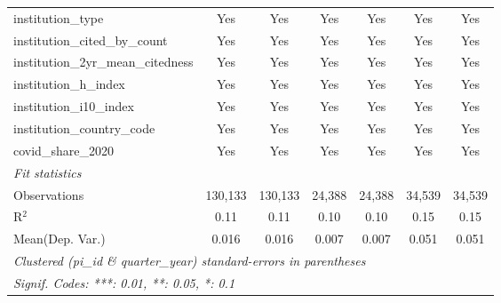 \begin{tabular}{lcccccc}
   institution\_type                                           & Yes            & Yes            & Yes            & Yes             & Yes          & Yes\\  
   institution\_cited\_by\_count                               & Yes            & Yes            & Yes            & Yes             & Yes          & Yes\\  
   institution\_2yr\_mean\_citedness                           & Yes            & Yes            & Yes            & Yes             & Yes          & Yes\\  
   institution\_h\_index                                       & Yes            & Yes            & Yes            & Yes             & Yes          & Yes\\  
   institution\_i10\_index                                     & Yes            & Yes            & Yes            & Yes             & Yes          & Yes\\  
   institution\_country\_code                                  & Yes            & Yes            & Yes            & Yes             & Yes          & Yes\\  
   covid\_share\_2020                                          & Yes            & Yes            & Yes            & Yes             & Yes          & Yes\\  
   \midrule
   \emph{Fit statistics}\\
   Observations                                                & 130,133        & 130,133        & 24,388         & 24,388          & 34,539       & 34,539\\  
   R$^2$                                                       & 0.11           & 0.11           & 0.10           & 0.10            & 0.15         & 0.15\\  
Mean(Dep. Var.) & 0.016 & 0.016 & 0.007 & 0.007 & 0.051 & 0.051 \\
   \midrule \midrule
   \multicolumn{7}{l}{\emph{Clustered (pi\_id \& quarter\_year) standard-errors in parentheses}}\\
   \multicolumn{7}{l}{\emph{Signif. Codes: ***: 0.01, **: 0.05, *: 0.1}}\\
\end{tabular}
\par\endgroup
